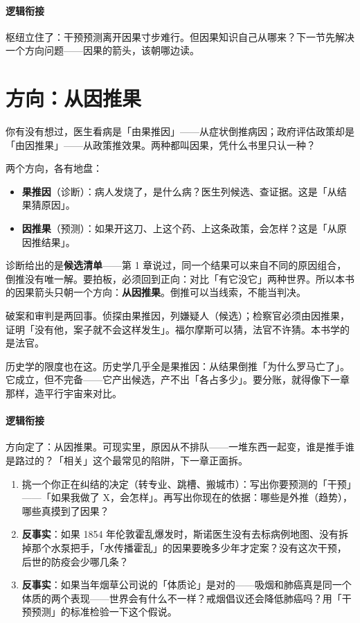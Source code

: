 \documentclass[../../main2.tex]{subfiles}
\begin{document}
\paragraph*{逻辑衔接}
	枢纽立住了：干预预测离开因果寸步难行。但因果知识自己从哪来？下一节先解决一个方向问题——因果的箭头，该朝哪边读。

\section{方向：从因推果}

\begin{readingnote}
	你有没有想过，医生看病是「由果推因」——从症状倒推病因；政府评估政策却是「由因推果」——从政策推效果。两种都叫因果，凭什么书里只认一种？
\end{readingnote}

两个方向，各有地盘：

\begin{itemize}
	\item \textbf{果推因}（诊断）：病人发烧了，是什么病？医生列候选、查证据。这是「从结果猜原因」。
	\item \textbf{因推果}（预测）：如果开这刀、上这个药、上这条政策，会怎样？这是「从原因推结果」。
\end{itemize}

诊断给出的是\textbf{候选清单}——第 1 章说过，同一个结果可以来自不同的原因组合，倒推没有唯一解。要拍板，必须回到正向：对比「有它没它」两种世界。所以本书的因果箭头只朝一个方向：\textbf{从因推果}。倒推可以当线索，不能当判决。

\begin{tcolorbox}[colback=green!5, title=\textit{生活类比}]
	破案和审判是两回事。侦探由果推因，列嫌疑人（候选）；检察官必须由因推果，证明「没有他，案子就不会这样发生」。福尔摩斯可以猜，法官不许猜。本书学的是法官。
\end{tcolorbox}

历史学的限度也在这。历史学几乎全是果推因：从结果倒推「为什么罗马亡了」。它成立，但不完备——它产出候选，产不出「各占多少」。要分账，就得像下一章那样，造平行宇宙来对比。

\paragraph*{逻辑衔接}
	方向定了：从因推果。可现实里，原因从不排队——一堆东西一起变，谁是推手谁是路过的？「相关」这个最常见的陷阱，下一章正面拆。

\begin{thinkbox}
\begin{enumerate}
	\item 挑一个你正在纠结的决定（转专业、跳槽、搬城市）：写出你要预测的「干预」——「如果我做了 X，会怎样」。再写出你现在的依据：哪些是外推（趋势），哪些真摸到了因果？
	\item \textbf{反事实}：如果 1854 年伦敦霍乱爆发时，斯诺医生没有去标病例地图、没有拆掉那个水泵把手，「水传播霍乱」的因果要晚多少年才定案？没有这次干预，后世的防疫会少哪几条？
	\item \textbf{反事实}：如果当年烟草公司说的「体质论」是对的——吸烟和肺癌真是同一个体质的两个表现——世界会有什么不一样？戒烟倡议还会降低肺癌吗？用「干预预测」的标准检验一下这个假说。
\end{enumerate}
\end{thinkbox}
\end{document}
